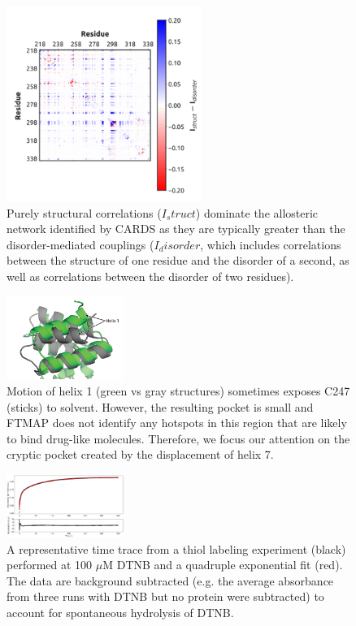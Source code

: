 \documentclass[../main.tex]{subfiles}
\begin{document}
    \begin{figure}[!htb] %
        \centering
        \includegraphics[width=2.5in]{ch5-suppfig2.png}
        \caption[Purely structural correlations dominate the eVP35 allosteric network.]
            {Purely structural correlations ($I_struct$) dominate the allosteric network identified by CARDS as they are typically greater than the disorder-mediated couplings ($I_disorder$, which includes correlations between the structure of one residue and the disorder of a second, as well as correlations between the disorder of two residues).}
        \label{fig:ch5-suppfig2}
    \end{figure}


    \begin{figure}[!htb] %
        \centering
        \includegraphics[width=1.5in]{ch5-suppfig3.png}
        \caption[Motion of helix 1 sometimes exposes C247 to solvent.]
            { Motion of helix 1 (green vs gray structures) sometimes exposes C247 (sticks) to solvent. However, the resulting pocket is small and FTMAP does not identify any hotspots in this region that are likely to bind drug-like molecules. Therefore, we focus our attention on the cryptic pocket created by the displacement of helix 7.}
        \label{fig:ch5-suppfig3}
    \end{figure}

    \begin{figure}[!htb] %
        \centering
        \includegraphics[width=1.5in]{ch5-suppfig4.png}
        \caption[A representative time trace from a thiol labeling experiment ]
            {A representative time trace from a thiol labeling experiment (black) performed at 100 $\mu$M DTNB and a quadruple exponential fit (red). The data are background subtracted (e.g. the average absorbance from three runs with DTNB but no protein were subtracted) to account for spontaneous hydrolysis of DTNB.}
        \label{fig:ch5-suppfig4}
    \end{figure}
\end{document}
